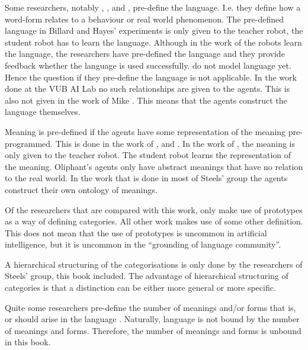 Some researchers, notably \citet{billard:1997a}, \citet{cangelosiparisi:1998}, and \citet{yancostein}, pre-define the language. I.e. they define how a word-form relates to a behaviour or real world phenomenon. The pre-defined language in Billard and Hayes' experiments is only given to the teacher robot, the student robot has to learn the language. Although in the work of \citeauthor{yancostein} the robots learn the language, the researchers have pre-defined the language and they provide feedback whether the language is used successfully. \citet{rosenstein:1998a} do not model language yet. Hence the question if they pre-define the language is not applicable. In the work done at the VUB AI Lab no such relationships are given to the agents. This is also not given in the work of Mike \citet{oliphant:1997}. This means that the agents construct the language themselves. 

Meaning is pre-defined if the agents have some representation of the meaning pre-programmed. This is done in the work of \citet{billard:1997a}, \citet{oliphant:1997} and \citet{yancostein}. In the work of \citeauthor{billard:1997a}, the meaning is only given to the teacher robot. The student robot learns the representation of the meaning. Oliphant's agents only have abstract meanings that have no relation to the real world. In the work that is done in most of Steels' group the agents construct their own ontology of meanings.

Of the researchers that are compared with this work, only \citet{rosenstein:1998a} make use of prototypes as a way of defining categories. All other work makes use of some other definition. This does not mean that the use of prototypes is uncommon in artificial intelligence, but it is uncommon in the ``grounding of language community''.

A hierarchical structuring of the categorisations is only done by the researchers of Steels' group, this book included. The advantage of hierarchical structuring of categories is that a distinction can be either more general or more specific.

Quite some researchers pre-define the number of meanings and/or forms that is, or should arise in the language \citep{billard:1997a,cangelosiparisi:1998,oliphant:1997,yancostein}. Naturally, language is not bound by the number of meanings and forms. Therefore, the number of meanings and forms is unbound in this book.


